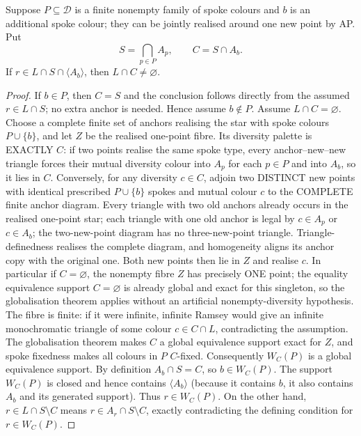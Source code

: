 \begin{lemma}\label{lem:rh-carrier}
Suppose $P\subseteq\mathcal D$ is a finite nonempty family of spoke
colours and $b$ is an additional spoke colour; they can be jointly
realised around one new point by AP. Put
\[
 S=\bigcap_{p\in P}A_p,\qquad C=S\cap A_b.
\]
If $r\in L\cap S\cap\langle A_b\rangle$, then
$L\cap C\ne\varnothing$.
\end{lemma}
\begin{proof}
If $b\in P$, then $C=S$ and the conclusion follows directly
from the assumed $r\in L\cap S$; no extra anchor is needed.
Hence assume $b\notin P$.
Assume $L\cap C=\varnothing$. Choose a complete finite set of
anchors realising the star with spoke colours $P\cup\{b\}$, and let
$Z$ be the realised one-point fibre. Its diversity palette is EXACTLY
$C$: if two points realise the same spoke type, every
anchor--new--new triangle forces their mutual diversity
colour into $A_p$ for each $p\in P$ and into $A_b$,
so it lies in $C$. Conversely, for any diversity
$c\in C$, adjoin two DISTINCT new points with
identical prescribed $P\cup\{b\}$ spokes and
mutual colour $c$ to the COMPLETE finite anchor
diagram. Every triangle with two old anchors
already occurs in the realised one-point star;
each triangle with one old anchor is legal
by $c\in A_p$ or $c\in A_b$; the two-new-point
diagram has no three-new-point triangle.
Triangle-definedness realises the complete
diagram, and homogeneity aligns its anchor
copy with the original one. Both new points
then lie in $Z$ and realise $c$.
In particular if $C=\varnothing$, the
nonempty fibre $Z$ has precisely ONE point;
the equality equivalence support
$C=\varnothing$ is already global and exact
for this singleton, so the globalisation
theorem applies without an artificial
nonempty-diversity hypothesis.
The fibre is finite: if it were
infinite, infinite Ramsey would give an infinite monochromatic
triangle of some colour $c\in C\cap L$, contradicting the assumption.
The globalisation theorem makes $C$ a global equivalence support
exact for $Z$, and spoke fixedness makes all colours in $P$ $C$-fixed.
Consequently $W_C(P)$ is a global equivalence support.
By definition $A_b\cap S=C$, so $b\in W_C(P)$. The support
$W_C(P)$ is closed and hence contains $\langle A_b\rangle$
(because it contains $b$, it also contains $A_b$ and its generated
support). Thus $r\in W_C(P)$. On the other hand,
$r\in L\cap S\setminus C$ means
$r\in A_r\cap S\setminus C$, exactly contradicting the defining
condition for $r\in W_C(P)$.
\end{proof}

